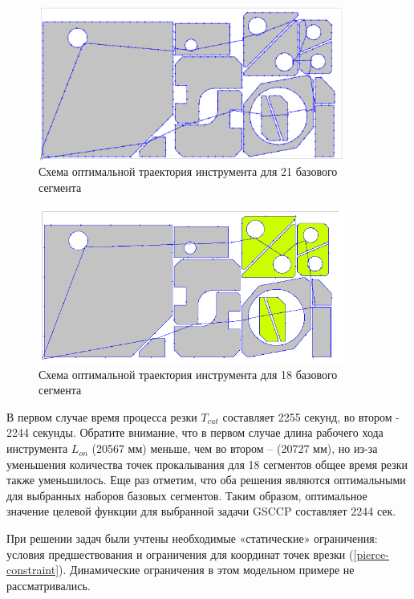 \documentclass[12pt]{report}
\begin{document}
\begin{figure}
  \begin{center}
  \includegraphics[width=0.9\textwidth]{path21.png}
  \caption{Схема оптимальной траектория инструмента для 21 базового сегмента}
  \label{path21}
  \end{center}
\end{figure}

\begin{figure}
  \begin{center}
  \includegraphics[width=0.9\textwidth]{path18.png}
  \caption{Схема оптимальной траектория инструмента для 18 базового сегмента}
  \label{path18}
  \end{center}
\end{figure}

В первом случае время процесса резки
$T_{cut}$
составляет 2255 секунд,
во втором - 2244 секунды.
Обратите внимание, что в первом случае длина рабочего хода инструмента
$L_{on}$
(20567 мм) меньше, чем во втором – (20727 мм),
но из-за уменьшения количества точек прокалывания
для 18 сегментов общее время резки также уменьшилось.
Еще раз отметим, что оба решения являются оптимальными
для выбранных наборов базовых сегментов.
Таким образом, оптимальное значение целевой
функции для выбранной задачи GSCCP составляет 2244 сек.

При решении задач были учтены необходимые «статические» ограничения:
условия предшествования и ограничения для координат
точек врезки (\ref{pierce-constraint}).
Динамические ограничения в этом модельном примере не рассматривались.
\end{document}
